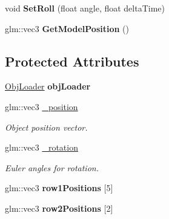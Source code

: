 \begin{DoxyCompactItemize}
\item 
\hypertarget{class_game_model_ac979ed93ce29ad431756fd4106eb9487}{void {\bfseries Set\+Roll} (float angle, float delta\+Time)}\label{class_game_model_ac979ed93ce29ad431756fd4106eb9487}

\item 
\hypertarget{class_game_model_add476e729c34d68e82c2a05df8db76aa}{glm\+::vec3 {\bfseries Get\+Model\+Position} ()}\label{class_game_model_add476e729c34d68e82c2a05df8db76aa}

\end{DoxyCompactItemize}
\subsection*{Protected Attributes}
\begin{DoxyCompactItemize}
\item 
\hypertarget{class_game_model_a530abcf1f5251b0662a4776e6538291f}{\hyperlink{class_obj_loader}{Obj\+Loader} {\bfseries obj\+Loader}}\label{class_game_model_a530abcf1f5251b0662a4776e6538291f}

\item 
\hypertarget{class_game_model_aa88c7afe0baa3cca630888fddacbc598}{glm\+::vec3 \hyperlink{class_game_model_aa88c7afe0baa3cca630888fddacbc598}{\+\_\+position}}\label{class_game_model_aa88c7afe0baa3cca630888fddacbc598}

\begin{DoxyCompactList}\small\item\em Object position vector. \end{DoxyCompactList}\item 
\hypertarget{class_game_model_a3eccfa0fa51b77085631d551290802a3}{glm\+::vec3 \hyperlink{class_game_model_a3eccfa0fa51b77085631d551290802a3}{\+\_\+rotation}}\label{class_game_model_a3eccfa0fa51b77085631d551290802a3}

\begin{DoxyCompactList}\small\item\em Euler angles for rotation. \end{DoxyCompactList}\item 
\hypertarget{class_game_model_a110846c2dc3ccb6b8a315429d28971ec}{glm\+::vec3 {\bfseries row1\+Positions} \mbox{[}5\mbox{]}}\label{class_game_model_a110846c2dc3ccb6b8a315429d28971ec}

\item 
\hypertarget{class_game_model_a3bd83c15408aa09fb3b4edc3588114aa}{glm\+::vec3 {\bfseries row2\+Positions} \mbox{[}2\mbox{]}}\label{class_game_model_a3bd83c15408aa09fb3b4edc3588114aa}


\end{DoxyCompactItemize}
